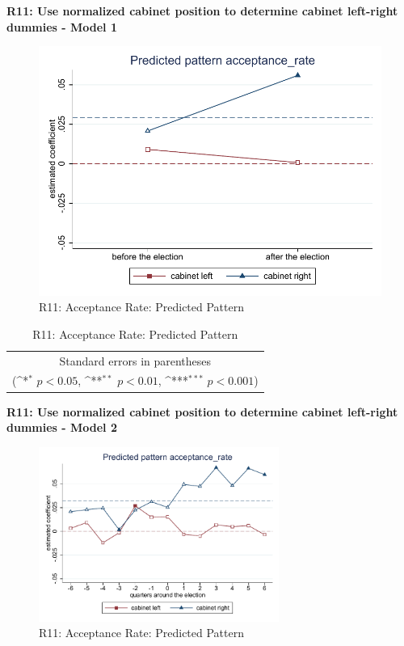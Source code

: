 \documentclass[10pt,a4paper]{scrartcl}
\begin{document}
\clearpage
\textbf{R11: Use normalized cabinet position to determine cabinet left-right dummies - Model 1}
\begin{figure}[!ht]
	\centering
	\includegraphics[width=1\textwidth]{figures_edited/acceptance_rate_graph1_R11.pdf}
	\caption{R11: Acceptance Rate: Predicted Pattern}
\end{figure}

\begin{table}[!ht]\centering
	\renewcommand{\arraystretch}{1.25}
	\def\sym#1{\ifmmode^{#1}\else\(^{#1}\)\fi}
	\caption{R11: Acceptance Rate: Predicted Pattern}
	\begin{tabular}{l*{2}{c}}
		\hline\hline
		
		\hline\hline
		\multicolumn{3}{c}{\footnotesize Standard errors in parentheses} \\
		\multicolumn{3}{c}{\footnotesize (\sym{*} \(p<0.05\), \sym{**} \(p<0.01\), \sym{***} \(p<0.001\))}\\
	\end{tabular}
\end{table}

\clearpage
\textbf{R11: Use normalized cabinet position to determine cabinet left-right dummies - Model 2}
\begin{figure}[!ht]
	\centering
	\includegraphics[width=0.7\textwidth]{figures_edited/acceptance_rate_graph2_R11.pdf}
	\caption{R11: Acceptance Rate: Predicted Pattern}
\end{figure}
\end{document}
